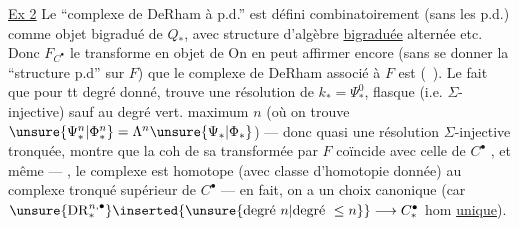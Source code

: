 \uline{Ex 2} Le ``complexe de DeRham à p.d.'' est défini combinatoirement (sans  les p.d.) comme objet bigradué de  $Q_*$, avec structure d'algèbre \uline{bigraduée} alternée etc. Donc $F_{C^\bullet}$ le transforme en objet de  On en peut affirmer encore (sans se donner la ``structure p.d'' sur $F$) que le complexe de DeRham associé à $F$ est  (\ ). Le fait que  pour tt degré  donné,  trouve une résolution de $k_*=\Psi_*^0$, flasque (i.e. $\Sigma$-injective) sauf au degré vert. maximum $n$ (où on trouve $\unsure{\Psi_*^n|\Phi_*^n}=\Lambda^n\unsure{\Psi_*|\Phi_*}$) --- donc quasi une résolution $\Sigma$-injective tronquée, montre que la coh de sa transformée par $F$ coïncide avec celle de $C^\bullet$  , et même --- , le complexe est homotope (avec classe d'homotopie donnée) au complexe tronqué supérieur de $C^\bullet$ --- en fait, on a un choix canonique (car $\unsure{\operatorname{DR}_*^{n,\bullet}}\inserted{\unsure{\text{degré }n|\text{degré }\le n}}\longrightarrow C_*^\bullet$ hom \uline{unique}).

